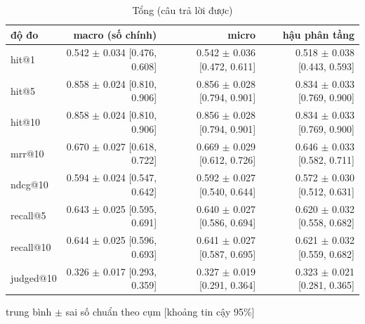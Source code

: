 
\begin{table}[ht]
\centering
\caption{Tổng (câu trả lời được)}
\begin{tabular}{lrrr}
\toprule
độ đo & macro (số chính) & micro & hậu phân tầng \\
\midrule
hit@1 & 0.542 $\pm$ 0.034 [0.476, 0.608] & 0.542 $\pm$ 0.036 [0.472, 0.611] & 0.518 $\pm$ 0.038 [0.443, 0.593] \\
hit@5 & 0.858 $\pm$ 0.024 [0.810, 0.906] & 0.856 $\pm$ 0.028 [0.794, 0.901] & 0.834 $\pm$ 0.033 [0.769, 0.900] \\
hit@10 & 0.858 $\pm$ 0.024 [0.810, 0.906] & 0.856 $\pm$ 0.028 [0.794, 0.901] & 0.834 $\pm$ 0.033 [0.769, 0.900] \\
mrr@10 & 0.670 $\pm$ 0.027 [0.618, 0.722] & 0.669 $\pm$ 0.029 [0.612, 0.726] & 0.646 $\pm$ 0.033 [0.582, 0.711] \\
ndcg@10 & 0.594 $\pm$ 0.024 [0.547, 0.642] & 0.592 $\pm$ 0.027 [0.540, 0.644] & 0.572 $\pm$ 0.030 [0.512, 0.631] \\
recall@5 & 0.643 $\pm$ 0.025 [0.595, 0.691] & 0.640 $\pm$ 0.027 [0.586, 0.694] & 0.620 $\pm$ 0.032 [0.558, 0.682] \\
recall@10 & 0.644 $\pm$ 0.025 [0.596, 0.693] & 0.641 $\pm$ 0.027 [0.587, 0.695] & 0.621 $\pm$ 0.032 [0.559, 0.682] \\
judged@10 & 0.326 $\pm$ 0.017 [0.293, 0.359] & 0.327 $\pm$ 0.019 [0.291, 0.364] & 0.323 $\pm$ 0.021 [0.281, 0.365] \\
\bottomrule
\end{tabular}
\par\smallskip\footnotesize trung bình $\pm$ sai số chuẩn theo cụm [khoảng tin cậy 95\%]
\end{table}

